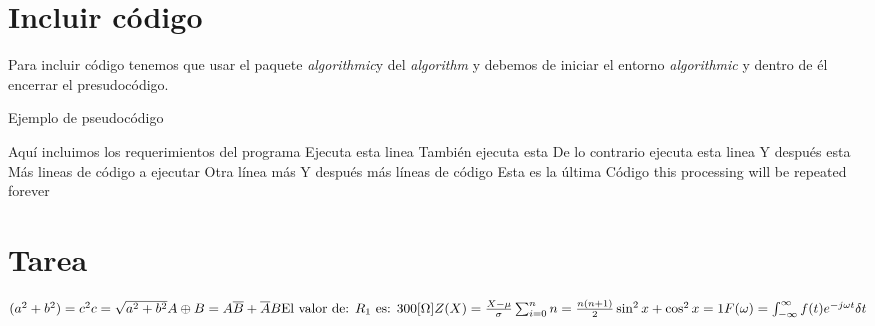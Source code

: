\documentclass{report}
\begin{document}
\chapter{Incluir código}
Para incluir código tenemos que usar el paquete \textit{algorithmic}y del \textit{algorithm} y debemos de iniciar el entorno \textit{algorithmic} y dentro de él encerrar el presudocódigo.


\begin{algorithm}
	\caption{Ejemplo de pseudocódigo}
	\begin{algorithmic}[1]
		\REQUIRE Aquí incluimos los requerimientos del programa
		\STATE Ejecuta esta linea
		\STATE También ejecuta esta
		\ELSE
		\STATE De lo contrario ejecuta esta linea
		\STATE Y después esta
		\ENDIF
		\STATE Más lineas de código a ejecutar
		\STATE Otra línea más
		\STATE Y después más líneas de código
		\STATE Esta es la última
		\ENDIF
		\ENDWHILE
		\STATE Código 
		\LOOP
		\STATE this processing will be repeated forever
		\ENDLOOP
	\end{algorithmic}
\end{algorithm}

\chapter{Tarea}

$( a^2+b^2)=c^2\\\\ c=\sqrt{a^2+b^2}\\\\
A\oplus B=A\overline{B}+\overline{A}B \\\\
\text{El valor de: } R_1 \text{ es: } 300[\Omega] \\\\
Z(X)=\frac{X-\mu}{\sigma}\\\\
\sum_{i=0}^nn=\frac{n(n+1)}{2}\\\\
\sin^2{x}+\cos^2{x}=1\\\\
F(\omega)=\int^\infty_{-\infty}{f(t)e^{-j\omega t}\delta t}$
\end{document}
